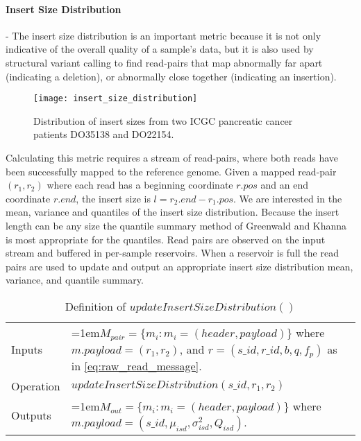 \paragraph{Insert Size Distribution} - The insert size distribution is an important metric because it is not only indicative of the overall quality of a sample's data, but it is also used by structural variant calling to find read-pairs that map abnormally far apart (indicating a deletion), or abnormally close together (indicating an insertion). 

\begin{figure}[H]
    \texttt{[image: insert\_size\_distribution]}
    \centering
    \caption {Distribution of insert sizes from two ICGC pancreatic cancer patients DO35138 and DO22154.\autocite{stephens2016simulating}}
    \label{fig:insert_size_distribution}
\end{figure} 

Calculating this metric requires a stream of read-pairs, where both reads have been successfully mapped to the reference genome. Given a mapped read-pair $(r_1,r_2)$ where each read has a beginning coordinate $r.pos$ and an end coordinate $r.end$, the insert size is $l = r_2.end - r_1.pos$. We are interested in the mean, variance and quantiles of the insert size distribution. Because the insert length can be any size the quantile summary method of Greenwald and Khanna\autocite{greenwald2001space} is most appropriate for the quantiles. Read pairs are observed on the input stream and buffered in per-sample reservoirs. When a reservoir is full the read pairs are used to update and output an appropriate insert size distribution mean, variance, and quantile summary.

\bgroup
\def\arraystretch{1.5}
\begin{table}[!ht]
    \caption{Definition of $updateInsertSizeDistribution()$}
    \label{tab:op_update_insert_size_dist}
    {\begin{tabular}{l|p{12cm}}
    \toprule
    Inputs & \hangindent=1em$M_{pair} = \{m_i: m_i = (header, payload)\}$ where $m.payload = (r_1,r_2)$, and $r = (s\_id, r\_id, b, q, f_p)$ as in \ref{eq:raw_read_message}. \\
    \cline{2-2}
    Operation & $updateInsertSizeDistribution(s\_id,r_1, r_2)$\\
    \cline{2-2}
    {Outputs} & \hangindent=1em$M_{out} = \{m_i: m_i = (header, payload)\}$ where $m.payload = (s\_id, \mu_{isd}, \sigma_{isd}^2, Q_{isd})$.\\
    \bottomrule
    \end{tabular}}
\end{table}
\egroup

